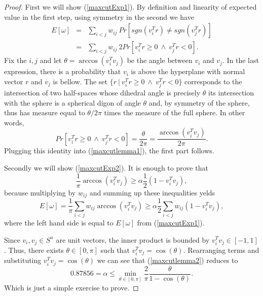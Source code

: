 \documentclass[12pt]{book}
\theoremstyle{definition}
\begin{document}
\begin{proof}
First we will show (\ref{maxcutExp1}). 
By definition and linearity of expected value in the first step, using symmetry in the second we have
\begin{eqnarray}
E[\omega] &=& \sum_{i<j} w_{ij} \ Pr\left[sgn(v_i^Tr) \neq sgn(v_j^Tr)\right]  \\
		  &=& \sum_{i<j} w_{ij} \ 2Pr\left[v_i^Tr\geq 0 \ \wedge \ v_j^Tr < 0\right].
		  \label{maxcutlemma1}
\end{eqnarray}
Fix the $i,j$ and let $\theta = \arccos(v_i^Tv_j)$ be the angle between $v_i$ and $v_j$.
In the last expression, there is a probability that $v_i$ is above the hyperplane with normal vector $r$ and $v_j$ is bellow. 
The set $\{r\ | \ v_i^Tr\geq 0 \ \wedge \ v_j^Tr < 0\}$ corresponds to the intersection of two half-spaces whose
dihedral angle is precisely $\theta$ its intersection with the sphere is a spherical
digon of angle $\theta$ and, by symmetry of the sphere, thus has measure equal to
$\theta/2\pi$ times the measure of the full sphere. In other words, 
\begin{equation*}
Pr\left[v_i^Tr\geq 0 \ \wedge \ v_j^Tr < 0\right] = \frac{\theta}{2\pi} = \frac{\arccos(v_i^Tv_j)}{2\pi}.
\end{equation*}
 Plugging this identity into (\ref{maxcutlemma1}), the first part follows.
 
 Secondly we will show (\ref{maxcutExp2}). It is enough to prove that  
  \begin{equation}
  \label{maxcutlemma2}
\frac{1}{\pi}\arccos(v_i^Tv_j )  \geq \alpha\frac{1}{2}(1-v_i^Tv_j),
 \end{equation}
because multiplying by $w_{ij}$ and summing up these inequalities yelds  
 \begin{equation*}
 E[\omega] = 	\frac{1}{\pi}\sum_{i<j}w_{ij}\arccos(v_i^Tv_j )  \geq \alpha\frac{1}{2}\sum_{i<j}w_{ij}(1-v_i^Tv_j),
 \end{equation*}
 where the left hand side is equal to $E[\omega]$ from (\ref{maxcutExp1}).
 
 Since $v_i,v_j\in S^n$ are unit vectors, the inner product is bounded by $v_i^Tv_j\in [-1,1]$. Thus, there exists $\theta\in[0,\pi]$ such that $v_i^Tv_j = \cos(\theta)$. Rearranging terms and substituting  $v_i^Tv_j = \cos(\theta)$ we can see that (\ref{maxcutlemma2}) reduces to 
 \begin{equation*}
 0.87856 = \alpha \leq \min_{\theta\in[0,\pi]} \frac{2}{\pi}\frac{\theta}{1-\cos(\theta)}.
 \end{equation*}
 Which is just a simple exercise to prove.
 
\end{proof}
\end{document}

